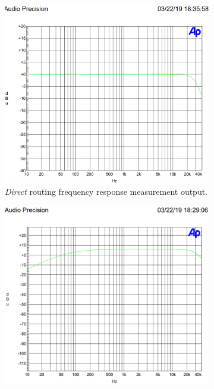 		\begin{figure}
			\centering
			\begin{subfigure}{0.45\textwidth}
				\includegraphics[width = \textwidth]{FinalImages/FR_direct.png}
				\caption{\emph{Direct} routing frequency response measurement output.}
				\label{fig:FR_AP_direct}
			\end{subfigure}
			\begin{subfigure}{0.45\textwidth}
				\includegraphics[width = \textwidth]{FinalImages/FR_sum.png}

\end{subfigure}
\end{figure}
